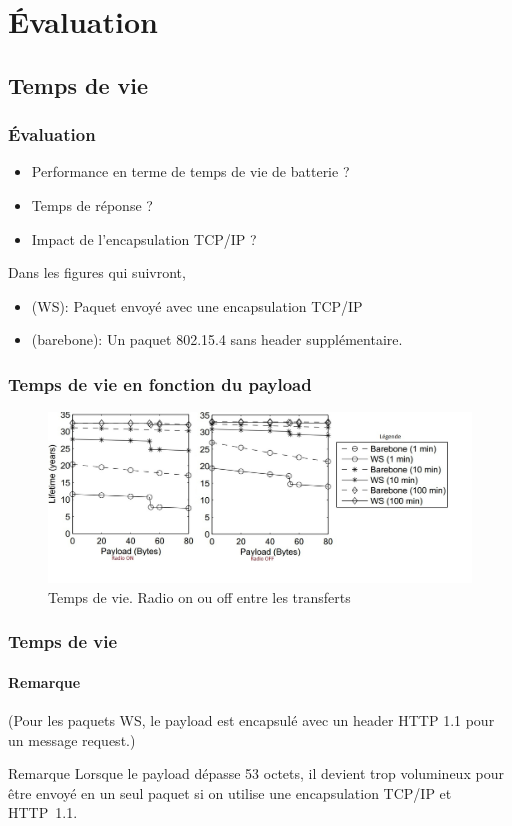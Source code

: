 \section{Évaluation}
\subsection{Temps de vie}
\begin{frame}
\frametitle{Évaluation}
\begin{itemize}
 \item Performance en terme de temps de vie de batterie ?
 \item Temps de réponse ?
 \item Impact de l'encapsulation TCP/IP ?
\end{itemize}
\vspace{5mm}
Dans les figures qui suivront,
\begin{itemize}
 \item (WS): Paquet envoyé avec une encapsulation TCP/IP %
 \item (barebone): Un paquet 802.15.4 sans header supplémentaire.
\end{itemize}
\end{frame}

\begin{frame}
 \frametitle{Temps de vie en fonction du payload}
 \begin{figure}
  \centering
  \includegraphics[scale=0.35]{figures/tempsvie.jpg}
  \caption{Temps de vie. Radio on ou off entre les transferts}
 \end{figure} 
\end{frame}

\begin{frame}
 \frametitle{Temps de vie}
 \framesubtitle{Remarque}
 (Pour les paquets WS, le payload est encapsulé avec un header HTTP 1.1 pour un message request.)\\
 \vspace{3mm}
 \begin{block}{Remarque}
  Lorsque le payload dépasse 53 octets, il devient trop volumineux pour être envoyé en un seul paquet si on utilise une encapsulation TCP/IP et HTTP~1.1.
 \end{block}
\end{frame}

